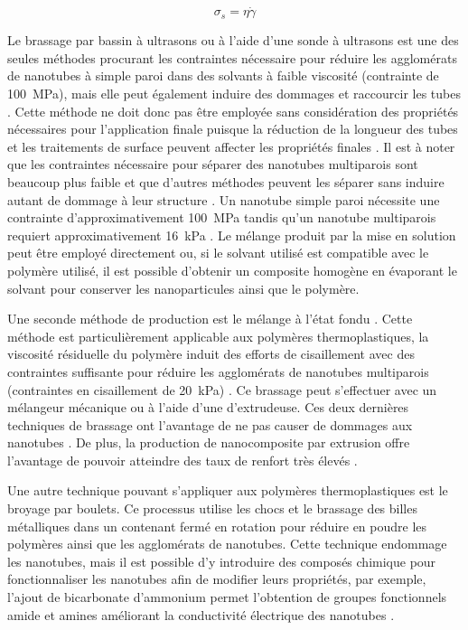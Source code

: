 \begin{equation}
\sigma_s = \eta \dot{\gamma}
\end{equation}

Le brassage par bassin à ultrasons ou à l'aide d'une sonde à ultrasons est une des seules méthodes procurant les contraintes nécessaire pour réduire les agglomérats de nanotubes à simple paroi dans des solvants à faible viscosité (contrainte de \SI[locale=FR]{100}{\mega\pascal}), mais elle peut également induire des dommages et raccourcir les tubes \cite{Huang2012}. 
Cette méthode ne doit donc pas être employée sans considération des propriétés nécessaires pour l'application finale puisque la réduction de la longueur des tubes et les traitements de surface peuvent affecter les propriétés finales \cite{Grossiord2008a, Diez-Pascual2010, Ma2008}.  
Il est à noter que les contraintes nécessaire pour séparer des nanotubes multiparois sont beaucoup plus faible et que d'autres méthodes peuvent les séparer sans induire autant de dommage à leur structure \cite{Huang2012, Ma2010}. 
Un nanotube simple paroi nécessite une contrainte d'approximativement \SI[locale=FR]{100}{\mega\pascal} tandis qu'un nanotube multiparois requiert approximativement \SI[locale=FR]{16}{\kilo\pascal} \cite{Huang2012}. 
Le mélange produit par la mise en solution peut être employé directement ou, si le solvant utilisé est compatible avec le polymère utilisé, il est possible d'obtenir un composite homogène en évaporant le solvant pour conserver les nanoparticules ainsi que le polymère. 

Une seconde méthode de production est le mélange à l'état fondu \cite{Ma2010}. 
Cette méthode est particulièrement applicable aux polymères thermoplastiques, la viscosité résiduelle du polymère induit des efforts de cisaillement avec des contraintes suffisante pour réduire les agglomérats de nanotubes multiparois (contraintes en cisaillement de \SI[locale=FR]{20}{\kilo\pascal}) \cite{Huang2012}. 
Ce brassage peut s'effectuer avec un mélangeur mécanique ou à l'aide d'une d'extrudeuse. 
Ces deux dernières techniques de brassage ont l'avantage de ne pas causer de dommages aux nanotubes \cite{Ma2010}. 
De plus, la production de nanocomposite par extrusion offre l'avantage de pouvoir atteindre des taux de renfort très élevés \cite{Ma2010}. 

Une autre technique pouvant s'appliquer aux polymères thermoplastiques est le broyage par boulets. 
Ce processus utilise les chocs et le brassage des billes métalliques dans un contenant fermé en rotation pour réduire en poudre les polymères ainsi que les agglomérats de nanotubes.
Cette technique endommage les nanotubes, mais il est possible d'y introduire des composés chimique pour fonctionnaliser les nanotubes afin de modifier leurs propriétés, par exemple, l'ajout de bicarbonate d'ammonium permet l'obtention de groupes fonctionnels amide et amines améliorant la conductivité électrique des nanotubes \cite{Ma2010, Ma2008a}. 

